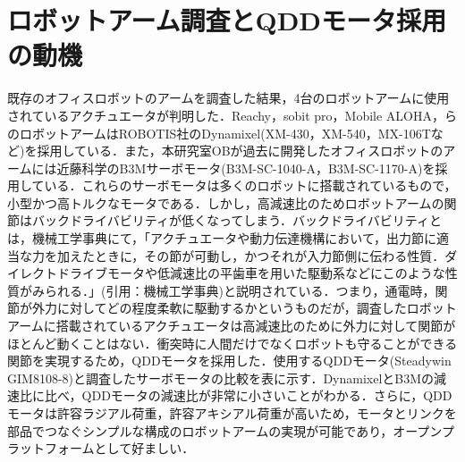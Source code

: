 \section{ロボットアーム調査とQDDモータ採用の動機}
既存のオフィスロボットのアームを調査した結果，4台のロボットアームに使用されているアクチュエータが判明した．Reachy，sobit pro，Mobile ALOHA，らのロボットアームはROBOTIS社のDynamixel(XM-430，XM-540，MX-106Tなど)を採用している．また，本研究室OBが過去に開発したオフィスロボットのアームには近藤科学のB3Mサーボモータ(B3M-SC-1040-A，B3M-SC-1170-A)を採用している．これらのサーボモータは多くのロボットに搭載されているもので，小型かつ高トルクなモータである．しかし，高減速比のためロボットアームの関節はバックドライバビリティが低くなってしまう．バックドライバビリティとは，機械工学事典にて，「アクチュエータや動力伝達機構において，出力節に適当な力を加えたときに，その節が可動し，かつそれが入力節側に伝わる性質．ダイレクトドライブモータや低減速比の平歯車を用いた駆動系などにこのような性質がみられる．」(引用：機械工学事典)と説明されている．つまり，通電時，関節が外力に対してどの程度柔軟に駆動するかというものだが，調査したロボットアームに搭載されているアクチュエータは高減速比のために外力に対して関節がほとんど動くことはない．衝突時に人間だけでなくロボットも守ることができる関節を実現するため，QDDモータを採用した．使用するQDDモータ(Steadywin GIM8108-8)と調査したサーボモータの比較を表に示す．DynamixelとB3Mの減速比に比べ，QDDモータの減速比が非常に小さいことがわかる．さらに，QDDモータは許容ラジアル荷重，許容アキシアル荷重が高いため，モータとリンクを部品でつなぐシンプルな構成のロボットアームの実現が可能であり，オープンプラットフォームとして好ましい．
